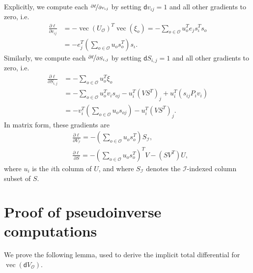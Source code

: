 \documentclass{article}
\DeclareMathOperator{\vect}{vec}
\newcommand{\dd}{\mathsf{d}}
\newcommand{\inndex}{\iota}
\newcommand{\outdex}{o}
\newcommand{\inset}{\mathcal{I}}
\newcommand{\outset}{\mathcal{O}}
\begin{document}
	Explicitly, we compute each $\nicefrac{\partial \ell}{\partial v_{\inndex j}}$ by setting $\dd v_{\inndex j} = 1$ and all other gradients to zero, i.e.
	\begin{equation}
		\begin{aligned}
			\frac{\partial \ell}{\partial v_{\inndex j}} &= -\vect(U_{\outset})^T \vect(\xi_{\outdex}) 
			= -\sum_{\outdex \in \outset} u_{\outdex}^T e_{j} s_{\inndex}^T s_{\outdex} \\
			&= -e_{j}^T \left(\sum_{\outdex \in \outset} u_{\outdex} s_{\outdex}^T   \right) s_{\inndex}.
		\end{aligned}
	\end{equation}
Similarly, we compute each $\nicefrac{\partial \ell}{\partial S_{i,j}}$ by setting $\dd S_{i,j} = 1$ and all other gradients to zero, i.e.
	\begin{equation}
		\begin{aligned}
			\frac{\partial \ell}{\partial S_{i,j}} &= -\sum_{\outdex \in \outset} u_{\outdex}^T \xi_{\outdex} \\
			&= -\sum_{\outdex \in \outset} u_{\outdex}^T v_i s_{\outdex j} - u_i^T (VS^T)_j + u_i^T (s_{ij} P_i v_i)\\
			&=-v_i^T(\sum_{\outdex \in \outset} u_{\outdex} s_{\outdex j}) - u_i^T (VS^T)_{j}.
		\end{aligned}
	\end{equation}
	In matrix form, these gradients are
	\begin{align}
		&\frac{\partial \ell}{\partial V_{\inset}} = -\left(\sum_{\outdex \in \outset} u_{\outdex} s_{\outdex}^T \right)S_{\inset}, \label{appeq:dl-dvin}\\
		&\frac{\partial \ell}{\partial S} = -\left(\sum_{\outdex \in \outset} u_{\outdex} s_{\outdex}^T \right)^TV - (S V^T)U, \label{appeq:dl-ds}
	\end{align}
	where $u_i$ is the $i$th column of $U$, and where $S_{\inset}$ denotes the $\inset$-indexed column subset of $S$. 
	
	\iffalse










\fi
	
	\section{Proof of pseudoinverse computations}
	\label{appsec:pseudoinverse-rule}
	We prove the following lemma, used to derive the implicit total differential for $\vect(\dd V_{\outset})$.
	
\end{document}
